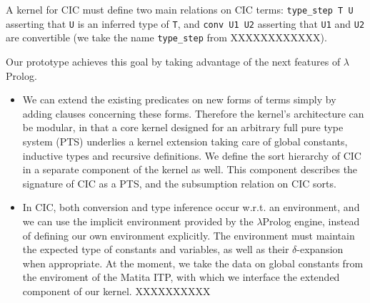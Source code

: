 A kernel for CIC must define two main relations on CIC terms:
\verb+type_step T U+
asserting that \verb+U+ is an inferred type of \verb+T+,
and \verb+conv U1 U2+ 
asserting that \verb+U1+ and \verb+U2+ are convertible
(we take the name \verb+type_step+ from XXXXXXXXXXXX).

Our prototype achieves this goal by taking advantage of the next features of $\lambda$Prolog.

\begin{itemize}

\item
We can extend the existing predicates on new forms of terms
simply by adding clauses concerning these forms. 
Therefore the kernel's architecture can be modular,
in that a core kernel designed for an arbitrary full pure type system (PTS)
underlies a kernel extension taking care of global constants,
inductive types and recursive definitions.
We define the sort hierarchy of CIC in a separate component of the kernel as well.
This component describes the signature of CIC as a PTS,
and the subsumption relation on CIC sorts.

\item
In CIC, both conversion and type inference occur w.r.t. an environment,
and we can use the implicit environment provided by the
$\lambda$Prolog engine, instead of defining our own environment explicitly.
The environment must maintain the expected type of constants and variables,
as well as their $\delta$-expansion when appropriate.
At the moment, we take the data on global constants from the
enviroment of the Matita ITP, with which we interface the extended
component of our kernel. XXXXXXXXXX

\end{itemize}
